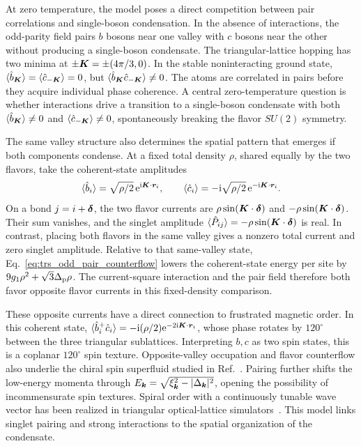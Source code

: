 At zero temperature, the model poses a direct competition between pair correlations and single-boson condensation. In the absence of interactions, the odd-parity field pairs $b$ bosons near one valley with $c$ bosons near the other without producing a single-boson condensate. The triangular-lattice hopping has two minima at $\pm\bm{K}=\pm(4\pi/3,0)$. In the stable noninteracting ground state, $\langle\hat b_{\bm{K}}\rangle=\langle\hat c_{-\bm{K}}\rangle=0$, but $\langle\hat b_{\bm{K}}\hat c_{-\bm{K}}\rangle\ne0$. The atoms are correlated in pairs before they acquire individual phase coherence. A central zero-temperature question is whether interactions drive a transition to a single-boson condensate with both $\langle\hat b_{\bm{K}}\rangle\ne0$ and $\langle\hat c_{-\bm{K}}\rangle\ne0$, spontaneously breaking the flavor $SU(2)$ symmetry.

The same valley structure also determines the spatial pattern that emerges if both components condense. At a fixed total density $\rho$, shared equally by the two flavors, take the coherent-state amplitudes
\begin{equation}
    \langle\hat b_i\rangle=\sqrt{\rho/2}\,\mathrm{e}^{\mathrm{i}\bm{K}\cdot\bm{r}_i},
    \qquad
    \langle\hat c_i\rangle=-\mathrm{i}\sqrt{\rho/2}\,\mathrm{e}^{-\mathrm{i}\bm{K}\cdot\bm{r}_i}.
    \label{eq:trs_odd_pair_counterflow}
\end{equation}
On a bond $j=i+\bm{\delta}$, the two flavor currents are $\rho\sin(\bm{K}\cdot\bm{\delta})$ and $-\rho\sin(\bm{K}\cdot\bm{\delta})$. Their sum vanishes, and the singlet amplitude $\langle\hat P_{ij}\rangle=-\rho\sin(\bm{K}\cdot\bm{\delta})$ is real. In contrast, placing both flavors in the same valley gives a nonzero total current and zero singlet amplitude. Relative to that same-valley state, Eq.~\eqref{eq:trs_odd_pair_counterflow} lowers the coherent-state energy per site by $9g_1\rho^2+\sqrt3\Delta_{\rm p}\rho$. The current-square interaction and the pair field therefore both favor opposite flavor currents in this fixed-density comparison.

These opposite currents have a direct connection to frustrated magnetic order. In this coherent state, $\langle\hat b_i^+\hat c_i\rangle=-\mathrm{i}(\rho/2)\mathrm{e}^{-2\mathrm{i}\bm{K}\cdot\bm{r}_i}$, whose phase rotates by $120^\circ$ between the three triangular sublattices. Interpreting $b,c$ as two spin states, this is a coplanar $120^\circ$ spin texture. Opposite-valley occupation and flavor counterflow also underlie the chiral spin superfluid studied in Ref.~\cite{liNatuParamekanti2014chiral}. Pairing further shifts the low-energy momenta through $E_{\bm{k}}=\sqrt{\xi_{\bm{k}}^2-|\Delta_{\bm{k}}|^2}$, opening the possibility of incommensurate spin textures. Spiral order with a continuously tunable wave vector has been realized in triangular optical-lattice simulators~\cite{struck2011frustrated}. This model links singlet pairing and strong interactions to the spatial organization of the condensate.

